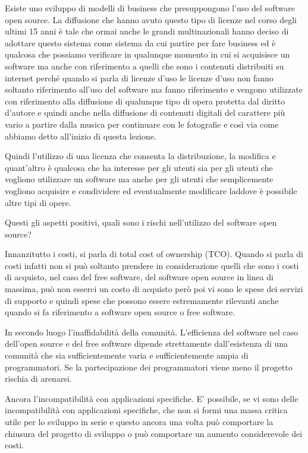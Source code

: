 Esiste uno sviluppo di modelli di business che presuppongono l'uso del software open source. 
La diffusione che hanno avuto questo tipo di licenze nel corso degli ultimi 15 anni è tale che ormai anche le grandi multinazionali hanno deciso di adottare questo sistema come sistema da cui partire per fare business ed è qualcosa che possiamo verificare in qualunque momento in cui si acquisisce un software ma anche con riferimento a quelli che sono i contenuti distribuiti su internet perché quando si parla di licenze d'uso le licenze d'uso non fanno soltanto riferimento all'uso del software ma fanno riferimento e vengono utilizzate con riferimento alla diffusione di qualunque tipo di opera protetta dal diritto d'autore e quindi anche nella diffusione di contenuti digitali del carattere più vario a partire dalla musica per continuare con le fotografie e così via come abbiamo detto all'inizio di questa lezione. 

Quindi l'utilizzo di una licenza che consenta la distribuzione, la modifica e quant'altro è qualcosa che ha interesse per gli utenti sia per gli utenti che vogliono utilizzare un software ma anche per gli utenti che semplicemente vogliono acquisire e condividere ed eventualmente modificare laddove è possibile altre tipi di opere. 

Questi gli aspetti positivi, quali sono i rischi nell'utilizzo del software open source? 

Innanzitutto i costi, si parla di total cost of ownership (TCO). Quando si parla di costi infatti non si può soltanto prendere in considerazione quelli che sono i costi di acquisto, nel caso del free software, del software open source in linea di massima, può non esserci un costo di acquisto però poi vi sono le spese dei servizi di supporto e quindi spese che possono essere estremamente rilevanti anche quando si fa riferimento a software open source o free software. 

In secondo luogo l'inaffidabilità della comunità. L'efficienza del software nel caso dell'open source e del free software dipende strettamente dall'esistenza di una comunità che sia sufficientemente varia e sufficientemente ampia di programmatori. Se la partecipazione dei programmatori viene meno il progetto rischia di arenarsi. 

Ancora l'incompatibilità con applicazioni specifiche. E' possibile, se vi sono delle incompatibilità con applicazioni specifiche, che non si formi una massa critica utile per lo sviluppo in serie e questo ancora una volta può comportare la chiusura del progetto di sviluppo o può comportare un aumento considerevole dei costi. 

